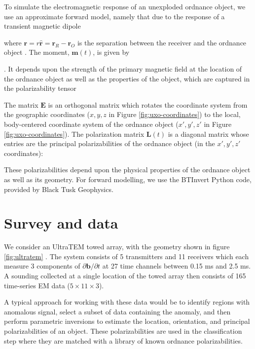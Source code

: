 \documentclass{segabs}
\begin{document}

To simulate the electromagnetic response of an unexploded ordnance object, we use an approximate forward model, namely that due to the response of a transient magnetic dipole

where $\mathbf{r} = r\mathbf{\hat{r}} = \mathbf{r}_R - \mathbf{r}_O$ is the separation between the receiver and the ordnance object \citep{Bell2001, Pasion2001, Zhang2003}. The moment, $\mathbf{m}(t)$, is given by

\cite{Bell2001}. It depends upon the strength of the primary magnetic field at the location of the ordnance object as well as the properties of the object, which are captured in the polarizability tensor

The matrix $\mathbf{E}$ is an orthogonal matrix which rotates the coordinate system from the geographic coordinates ($x, y, z$ in Figure \ref{fig:uxo-coordinates}) to the local, body-centered coordinate system of the ordnance object ($x', y', z'$ in Figure \ref{fig:uxo-coordinates}). The polarization matrix $\mathbf{L}(t)$ is a diagonal matrix whose entries are the principal polarizabilities of the ordnance object (in the $x', y', z'$ coordinates):

These polarizabilities depend upon the physical properties of the ordnance object as well as its geometry. For forward modelling, we use the BTInvert Python code, provided by Black Tusk Geophysics.

\section{Survey and data}

We consider an UltraTEM towed array, with the geometry shown in figure \ref{fig:ultratem} \citep{Billings2018}. The system consists of 5 transmitters and 11 receivers which each measure 3 components of $\partial \mathbf{b}/\partial t$ at 27 time channels between 0.15 ms and 2.5 ms. A sounding collected at a single location of the towed array then consists of 165 time-series EM data ($5 \times 11 \times 3$).


A typical approach for working with these data would be to identify regions with anomalous signal, select a subset of data containing the anomaly, and then perform parametric inversions to estimate the location, orientation, and principal polarizabilities of an object. These polarizabilities are used in the classification step where they are matched with a library of known ordnance polarizabilities.
\end{document}
